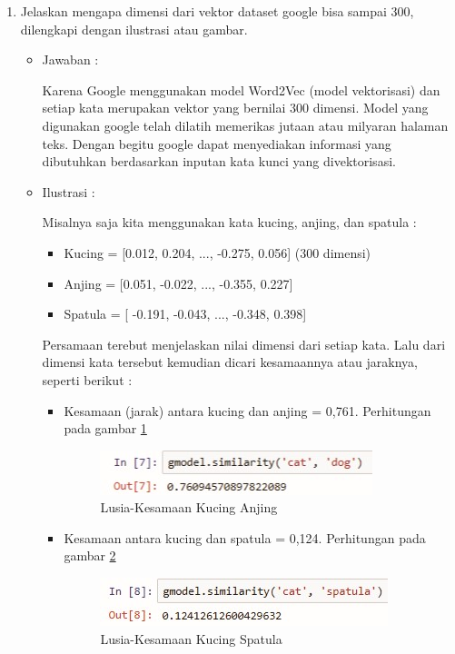 \begin{enumerate}
\item Jelaskan mengapa dimensi dari vektor dataset google bisa sampai 300, dilengkapi
dengan ilustrasi atau gambar.
	\begin{itemize}
	\item Jawaban :
		\par Karena Google menggunakan model Word2Vec (model vektorisasi) dan setiap kata merupakan vektor yang bernilai 300 dimensi. Model yang digunakan google telah dilatih memerikas jutaan atau milyaran halaman teks. Dengan begitu google dapat menyediakan informasi yang dibutuhkan berdasarkan inputan kata kunci yang divektorisasi.
	\item Ilustrasi :
		\par Misalnya saja kita menggunakan kata kucing, anjing, dan spatula :
	
	\begin{itemize}
	\item Kucing = [0.012, 0.204, ..., -0.275, 0.056] (300 dimensi)
	\item Anjing = [0.051, -0.022, ..., -0.355, 0.227]
	\item Spatula = [ -0.191, -0.043, ..., -0.348, 0.398]
	\end{itemize}
	
	\par Persamaan terebut menjelaskan nilai dimensi dari setiap kata. Lalu dari dimensi kata tersebut kemudian dicari kesamaannya atau jaraknya, seperti berikut :	
	
	\begin{itemize}
	\item Kesamaan (jarak) antara kucing dan anjing = 0,761. Perhitungan pada gambar \ref{5a2}
		\begin{figure}[!hbtp]
		\centering
		\includegraphics[scale=0.5]{figures/p2a.jpg}
		\caption{Lusia-Kesamaan Kucing Anjing}
		\label{5a2}
		\end{figure}
	\item Kesamaan antara kucing dan spatula = 0,124. Perhitungan pada gambar  \ref{5a3}
		\begin{figure}[!hbtp]
		\centering
		\includegraphics[scale=0.5]{figures/p2b.jpg}
		\caption{Lusia-Kesamaan Kucing Spatula}
		\label{5a3}
		\end{figure}
	\end{itemize}
	

\end{itemize}
\end{enumerate}
